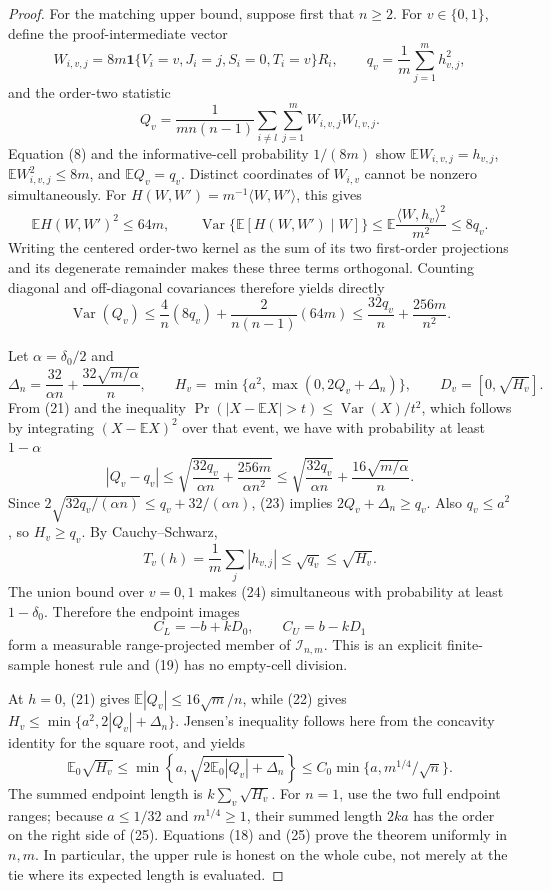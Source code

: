 \documentclass{article}
\begin{document}
\begin{proof}
For the matching upper bound, suppose first that \(n\ge2\).  For
\(v\in\{0,1\}\), define the proof-intermediate vector
\[
 W_{i,v,j}=8m\mathbf1\{V_i=v,J_i=j,S_i=0,T_i=v\}R_i,
 \qquad q_v=\frac1m\sum_{j=1}^mh_{v,j}^2,
\]
and the order-two statistic
\[
 Q_v=\frac1{mn(n-1)}\sum_{i\ne l}\sum_{j=1}^mW_{i,v,j}W_{l,v,j}.          \tag{19}
\]
Equation (8) and the informative-cell probability \(1/(8m)\) show
\(\mathbb EW_{i,v,j}=h_{v,j}\), \(\mathbb EW_{i,v,j}^2\le8m\), and
\(\mathbb EQ_v=q_v\).  Distinct coordinates of \(W_{i,v}\) cannot be
nonzero simultaneously.  For \(H(W,W')=m^{-1}\langle W,W'\rangle\), this
gives
\[
 \mathbb EH(W,W')^2\le64m,
 \qquad
 \operatorname{Var}\{\mathbb E[H(W,W')\mid W]\}
 \le\mathbb E\frac{\langle W,h_v\rangle^2}{m^2}\le8q_v.                 \tag{20}
\]
Writing the centered order-two kernel as the sum of its two first-order
projections and its degenerate remainder makes these three terms orthogonal.
Counting diagonal and off-diagonal covariances therefore yields directly
\[
 \operatorname{Var}(Q_v)
 \le\frac{4}{n}(8q_v)+\frac{2}{n(n-1)}(64m)
 \le\frac{32q_v}{n}+\frac{256m}{n^2}.                                   \tag{21}
\]

Let \(\alpha=\delta_0/2\) and
\[
 \Delta_n=\frac{32}{\alpha n}+\frac{32\sqrt{m/\alpha}}n,
 \qquad
 H_v=\min\{a^2,\max(0,2Q_v+\Delta_n)\},
 \qquad D_v=[0,\sqrt{H_v}].                                             \tag{22}
\]
From (21) and the inequality
\(\Pr(|X-\mathbb EX|>t)\le\operatorname{Var}(X)/t^2\), which follows by
integrating \((X-\mathbb EX)^2\) over that event, we have with probability
at least \(1-\alpha\)
\[
 |Q_v-q_v|\le
 \sqrt{\frac{32q_v}{\alpha n}+\frac{256m}{\alpha n^2}}
 \le\sqrt{\frac{32q_v}{\alpha n}}+\frac{16\sqrt{m/\alpha}}n.            \tag{23}
\]
Since \(2\sqrt{32q_v/(\alpha n)}\le q_v+32/(\alpha n)\), (23) implies
\(2Q_v+\Delta_n\ge q_v\).  Also \(q_v\le a^2\), so \(H_v\ge q_v\).
By Cauchy--Schwarz,
\[
 T_v(h)=\frac1m\sum_j|h_{v,j}|\le\sqrt{q_v}\le\sqrt{H_v}.               \tag{24}
\]
The union bound over \(v=0,1\) makes (24) simultaneous with probability at
least \(1-\delta_0\).  Therefore the endpoint images
\[
 C_L=-b+kD_0,\qquad C_U=b-kD_1
\]
form a measurable range-projected member of \(\mathcal I_{n,m}\).  This is
an explicit finite-sample honest rule and (19) has no empty-cell division.

At \(h=0\), (21) gives \(\mathbb E|Q_v|\le16\sqrt m/n\), while (22) gives
\(H_v\le\min\{a^2,2|Q_v|+\Delta_n\}\).  Jensen's inequality follows here
from the concavity identity for the square root, and yields
\[
 \mathbb E_0\sqrt{H_v}
 \le\min\left\{a,\sqrt{2\mathbb E_0|Q_v|+\Delta_n}\right\}
 \le C_0\min\{a,m^{1/4}/\sqrt n\}.                                      \tag{25}
\]
The summed endpoint length is \(k\sum_v\sqrt{H_v}\).  For \(n=1\), use
the two full endpoint ranges; because \(a\le1/32\) and \(m^{1/4}\ge1\),
their summed length \(2ka\) has the order on the right side of (25).
Equations (18) and (25) prove the theorem uniformly in \(n,m\).  In
particular, the upper rule is honest on the whole cube, not merely at the
tie where its expected length is evaluated.
\end{proof}
\end{document}
